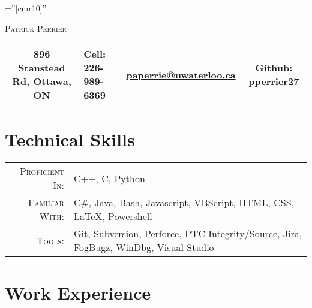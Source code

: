 \documentclass[a4paper,10pt]{article}
\newcommand\Tstrut{\rule{0pt}{2.9ex}}         %
\newcommand\Bstrut{\rule[-1.2ex]{0pt}{0pt}}   %
\newcommand\TBstrut{\Tstrut\Bstrut}           %
\begin{document}
\pagestyle{empty} %

\font\fb=''[cmr10]'' %

\par{\centering
		{\Huge \textsc{Patrick Perrier}
	}\bigskip\par}
\par{
	\begin{tabularx}{\textwidth}{c X X c}
		\hline
		896 Stanstead Rd, Ottawa, ON & Cell: 226-989-6369 
		& \href{mailto:paperrie@uwaterloo.ca}{paperrie@uwaterloo.ca}
		& Github: \href{https://github.com/pperrier27}{pperrier27} \TBstrut \\
		\hline
	\end{tabularx}
}
\section{Technical Skills}

\begin{tabular}{rl}
    \textsc{Proficient In:} & C++, C, Python \\
    \textsc{Familiar With:} & C\#, Java, Bash, Javascript, VBScript, HTML, CSS, \LaTeX, Powershell\\
   	\textsc{Tools:} & Git, Subversion, Perforce, PTC Integrity/Source, Jira, FogBugz, WinDbg, Visual Studio
\end{tabular}

\section{Work Experience}


\end{document}
